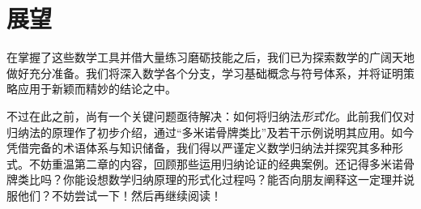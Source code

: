 \section{展望}

在掌握了这些数学工具并借大量练习磨砺技能之后，我们已为探索数学的广阔天地做好充分准备。我们将深入数学各个分支，学习基础概念与符号体系，并将证明策略应用于新颖而精妙的结论之中。

不过在此之前，尚有一个关键问题亟待解决：如何将归纳法\emph{形式化}。此前我们仅对归纳法的原理作了初步介绍，通过``多米诺骨牌类比''及若干示例说明其应用。如今凭借完备的术语体系与知识储备，我们得以严谨定义数学归纳法并探究其多种形式。不妨重温第二章的内容，回顾那些运用归纳论证的经典案例。还记得多米诺骨牌类比吗？你能设想数学归纳原理的形式化过程吗？能否向朋友阐释这一定理并说服他们？不妨尝试一下！然后再继续阅读！
